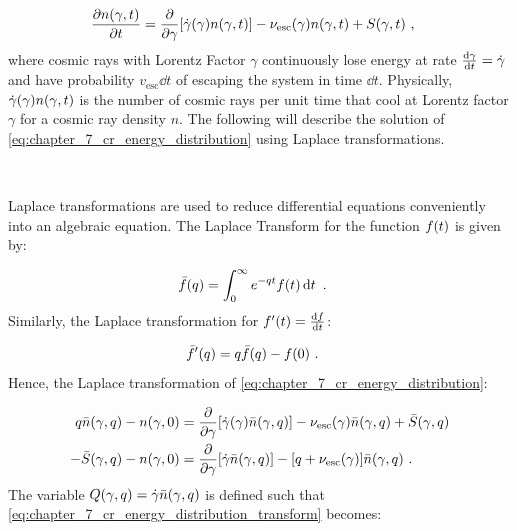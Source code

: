\begin{equation}
    \begin{aligned}
    \pdv{n\qty(\gamma,t)}{t}&=\pdv{ }{\gamma}\qty[\dot{\gamma}\qty(\gamma)n\qty(\gamma, t)] - \nu_\text{esc}\qty(\gamma)n\qty(\gamma,t) + S\qty(\gamma, t)\text{ ,}
    \end{aligned} \label{eq:chapter_7_cr_energy_distribution}
\end{equation}
\noindent where cosmic rays with Lorentz Factor $\gamma$ continuously lose energy at rate $\dv{\gamma}{t}=\dot{\gamma}$ and have probability $v_\text{esc}\dd{t}$ of escaping the system in time $\dd{t}$. Physically, $\dot{\gamma}\qty(\gamma)n\qty(\gamma,t)$ is the number of cosmic rays per unit time that cool at Lorentz factor $\gamma$ for a cosmic ray density $n$. The following will describe the solution of \autoref{eq:chapter_7_cr_energy_distribution} using Laplace transformations.
\par~\par
Laplace transformations are used to reduce differential equations conveniently into an algebraic equation. The Laplace Transform for the function $f\qty(t)$ is given by:

\begin{equation}
    \begin{aligned}
        \bar{f}\qty(q)&=\int_0^\infty e^{-qt}f\qty(t)\dd{t}\text{ .}
    \end{aligned}
\end{equation}
\noindent Similarly, the Laplace transformation for $f'\qty(t)=\dv{f}{t}$:

\begin{equation}
	\begin{aligned}
		\bar{f}'\qty(q)&=q\bar{f}\qty(q)-f\qty(0)\text{ .}
	\end{aligned}
\end{equation}
\noindent Hence, the Laplace transformation of \autoref{eq:chapter_7_cr_energy_distribution}:

\begin{equation}
    \begin{aligned}
        q\bar{n}\qty(\gamma, q)-n\qty(\gamma,0)&=\pdv{}{\gamma}\qty[\dot{\gamma}\qty(\gamma)\bar{n}\qty(\gamma, q)] - \nu_\text{esc}\qty(\gamma)\bar{n}\qty(\gamma,q) + \bar{S}\qty(\gamma, q) \\
        -\bar{S}\qty(\gamma,q)-n\qty(\gamma,0)&=\pdv{}{\gamma}\qty[\dot{\gamma}\bar{n}\qty(\gamma,q)]-\qty[q+\nu_\text{esc}\qty(\gamma)]\bar{n}\qty(\gamma,q)\text{ .}
    \end{aligned} \label{eq:chapter_7_cr_energy_distribution_transform}
\end{equation}
\noindent The variable $Q\qty(\gamma,q)=\dot{\gamma}\bar{n}\qty(\gamma,q)$ is defined such that \autoref{eq:chapter_7_cr_energy_distribution_transform} becomes:

